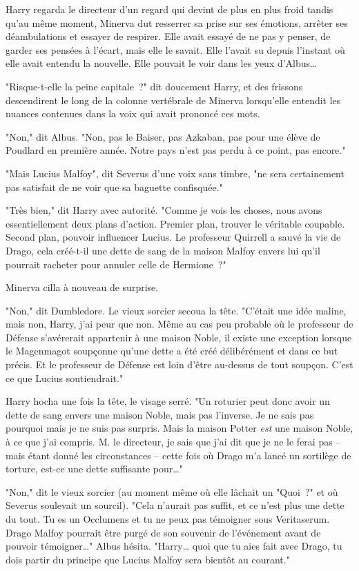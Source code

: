 Harry regarda le directeur d'un regard qui devint de plus en plus froid tandis qu'au même moment, Minerva dut resserrer sa prise sur ses émotions, arrêter ses déambulations et essayer de respirer. Elle avait essayé de ne pas y penser, de garder ses pensées à l'écart, mais elle le savait. Elle l'avait su depuis l'instant où elle avait entendu la nouvelle. Elle pouvait le voir dans les yeux d'Albus…

"Risque-t-elle la peine capitale~?" dit doucement Harry, et des frissons descendirent le long de la colonne vertébrale de Minerva lorsqu'elle entendit les nuances contenues dans la voix qui avait prononcé ces mots.

"Non," dit Albus. "Non, pas le Baiser, pas Azkaban, pas pour une élève de Poudlard en première année. Notre pays n'est pas perdu à ce point, pas encore."

"Mais Lucius Malfoy", dit Severus d'une voix sans timbre, "ne sera certainement pas satisfait de ne voir que sa baguette confisquée."

"Très bien," dit Harry avec autorité. "Comme je vois les choses, nous avons essentiellement deux plans d'action. Premier plan, trouver le véritable coupable. Second plan, pouvoir influencer Lucius. Le professeur Quirrell a sauvé la vie de Drago, cela créé-t-il une dette de sang de la maison Malfoy envers lui qu'il pourrait racheter pour annuler celle de Hermione~?"

Minerva cilla à nouveau de surprise.

"Non," dit Dumbledore. Le vieux sorcier secoua la tête. "C'était une idée maline, mais non, Harry, j'ai peur que non. Même au cas peu probable où le professeur de Défense s'avérerait appartenir à une maison Noble, il existe une exception lorsque le Magenmagot soupçonne qu'une dette a été créé délibérément et dans ce but précis. Et le professeur de Défense est loin d'être au-dessus de tout soupçon. C'est ce que Lucius soutiendrait."

Harry hocha une fois la tête, le visage serré. "Un roturier peut donc avoir un dette de sang envers une maison Noble, mais pas l'inverse. Je ne sais pas pourquoi mais je ne suis pas surpris. Mais la maison Potter \emph{est} une maison Noble, à ce que j'ai compris. M. le directeur, je sais que j'ai dit que je ne le ferai pas -- mais étant donné les circonstances -- cette fois où Drago m'a lancé un sortilège de torture, est-ce une dette suffisante pour…"

"Non," dit le vieux sorcier (au moment même où elle lâchait un "Quoi~?" et où Severus soulevait un sourcil). "Cela n'aurait pas suffit, et ce n'est plus une dette du tout. Tu es un Occlumens et tu ne peux pas témoigner sous Veritaserum. Drago Malfoy pourrait être purgé de son souvenir de l'événement avant de pouvoir témoigner…" Albus hésita. "Harry… quoi que tu aies fait avec Drago, tu dois partir du principe que Lucius Malfoy sera bientôt au courant."

